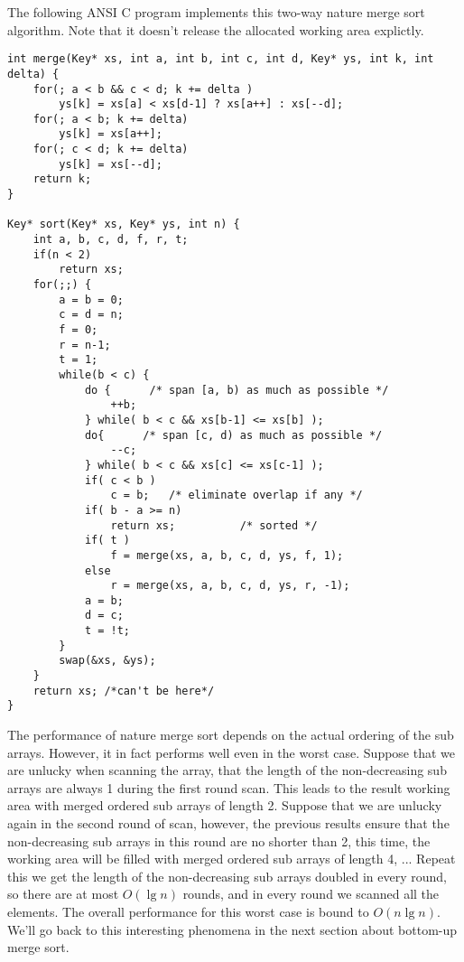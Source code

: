 \documentclass[UTF8]{article}
\begin{document}
The following ANSI C program implements this two-way nature merge sort algorithm. Note that it
doesn't release the allocated working area explictly.

\lstset{language=C}
\begin{lstlisting}
int merge(Key* xs, int a, int b, int c, int d, Key* ys, int k, int delta) {
    for(; a < b && c < d; k += delta )
        ys[k] = xs[a] < xs[d-1] ? xs[a++] : xs[--d];
    for(; a < b; k += delta)
        ys[k] = xs[a++];
    for(; c < d; k += delta)
        ys[k] = xs[--d];
    return k;
}

Key* sort(Key* xs, Key* ys, int n) {
    int a, b, c, d, f, r, t;
    if(n < 2)
        return xs;
    for(;;) {
        a = b = 0;
        c = d = n;
        f = 0;
        r = n-1;
        t = 1;
        while(b < c) {
            do {      /* span [a, b) as much as possible */
                ++b;
            } while( b < c && xs[b-1] <= xs[b] );
            do{      /* span [c, d) as much as possible */
                --c;
            } while( b < c && xs[c] <= xs[c-1] );
            if( c < b )
                c = b;   /* eliminate overlap if any */
            if( b - a >= n)
                return xs;          /* sorted */
            if( t )
                f = merge(xs, a, b, c, d, ys, f, 1);
            else
                r = merge(xs, a, b, c, d, ys, r, -1);
            a = b;
            d = c;
            t = !t;
        }
        swap(&xs, &ys);
    }
    return xs; /*can't be here*/
}
\end{lstlisting}

The performance of nature merge sort depends on the actual ordering of the sub arrays. However, it in fact performs
well even in the worst case. Suppose that we are unlucky when scanning the array, that the length of the non-decreasing
sub arrays are always 1 during the first round scan. This leads to the result working area with merged ordered sub
arrays of length 2. Suppose that we are unlucky again in the second round of scan, however, the previous results
ensure that the non-decreasing sub arrays in this round are no shorter than 2, this time, the working area will
be filled with merged ordered sub arrays of length 4, ... Repeat this we get the length of the non-decreasing sub arrays
doubled in every round, so there are at most $O(\lg n)$ rounds, and in every round we scanned all the elements.
The overall performance for this worst case is bound to $O(n \lg n)$. We'll go back to this interesting phenomena
in the next section about bottom-up merge sort.
\end{document}
